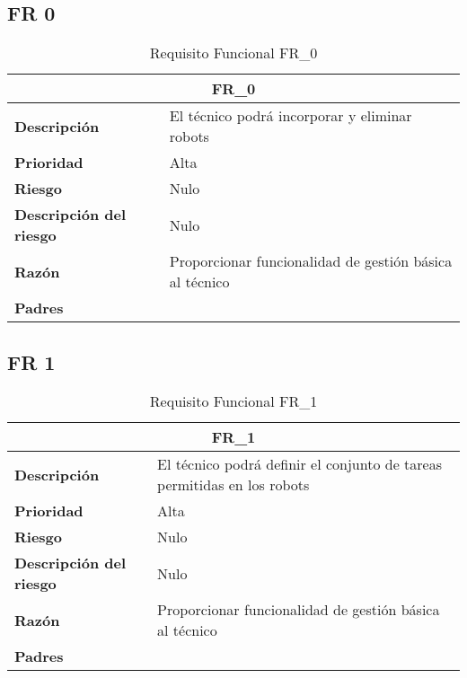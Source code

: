 \documentclass{scrreprt}
\begin{document}
\subsection{FR 0}

\begin{table}[H]
    \label{tab:my-table}
    \begin{tabular}{|p{5cm}|p{11cm}|}
    \hline
    \multicolumn{2}{|c|}{\textbf{FR_0}} \\
    \hline
    \textbf{Descripción  }                      & El técnico podrá incorporar y eliminar robots  \\ \hline
    \textbf{Prioridad}                          & Alta \\ \hline
    \textbf{Riesgo}                          & Nulo \\ \hline
    \textbf{Descripción del riesgo}                    & Nulo  \\ \hline
    \textbf{Razón}                   & Proporcionar funcionalidad de gestión básica al técnico  \\ \hline
    \textbf{Padres}                               &  \\  \hline
    \end{tabular}%
    \caption{Requisito Funcional FR_0}
\end{table}

\subsection{FR 1}
\begin{table}[H]
    \label{tab:my-table}
    
    \begin{tabular}{|p{5cm}|p{11cm}|}
    \hline
    \multicolumn{2}{|c|}{\textbf{FR_1}} \\
    \hline
    \textbf{Descripción  }                      & El técnico podrá definir el conjunto de tareas permitidas en los robots                                                                                            \\ \hline
    \textbf{Prioridad}                          & Alta                                                                                              \\ \hline
    \textbf{Riesgo}                          & Nulo                                                                                                \\ \hline
    \textbf{Descripción del riesgo}                    & Nulo                                                                               \\ \hline
    \textbf{Razón}                   & Proporcionar funcionalidad de gestión básica al técnico                                                                                                 \\ \hline
    \textbf{Padres}                               &  \\  \hline
    \end{tabular}%
    
    \caption{Requisito Funcional FR_1}
\end{table}
\end{document}
